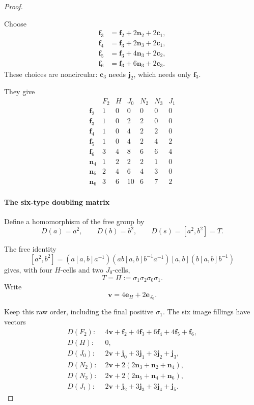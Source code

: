 \begin{proof}
\begin{itemize}[leftmargin=*]
\end{itemize}
Choose
\[
\begin{aligned}
\mathbf f_3&=\mathbf f_2+2\mathbf n_2+2\mathbf c_1,\\
\mathbf f_4&=\mathbf f_3+2\mathbf n_3+2\mathbf c_1,\\
\mathbf f_5&=\mathbf f_3+4\mathbf n_3+2\mathbf c_2,\\
\mathbf f_6&=\mathbf f_3+6\mathbf n_3+2\mathbf c_3.
\end{aligned}
\]
These choices are noncircular: \(\mathbf c_3\) needs \(\mathbf j_2\), which needs only \(\mathbf f_3\).

They give
\[
\begin{array}{c|rrrrrr}
&F_2&H&J_0&N_2&N_3&J_1\\ \hline
\mathbf f_2&1&0&0&0&0&0\\
\mathbf f_3&1&0&2&2&0&0\\
\mathbf f_4&1&0&4&2&2&0\\
\mathbf f_5&1&0&4&2&4&2\\
\mathbf f_6&3&4&8&6&6&4\\
\mathbf n_4&1&2&2&2&1&0\\
\mathbf n_5&2&4&6&4&3&0\\
\mathbf n_6&3&6&10&6&7&2
\end{array}
\]

\paragraph{The six-type doubling matrix}

Define a homomorphism of the free group by
\[
D(a)=a^2,\qquad D(b)=b^2,\qquad
D(s)=[a^2,b^2]=T.
\]

The free identity
\[
[a^2,b^2]
=(a[a,b]a^{-1})(ab[a,b]b^{-1}a^{-1})
[a,b](b[a,b]b^{-1})
\]
gives, with four \(H\)-cells and two \(J_0\)-cells,
\[
T=\Pi:=\sigma_1\sigma_2\sigma_0\sigma_1.
\]
Write
\[
\mathbf v=4\mathbf e_H+2\mathbf e_{J_0}.
\]

Keep this raw order, including the final positive \(\sigma_1\). The six image fillings have vectors
\[
\begin{aligned}
D(F_2):\;&4\mathbf v+\mathbf f_2+4\mathbf f_3
 +6\mathbf f_4+4\mathbf f_5+\mathbf f_6,\\
D(H):\;&0,\\
D(J_0):\;&2\mathbf v+\mathbf j_0+3\mathbf j_1
 +3\mathbf j_2+\mathbf j_3,\\
D(N_2):\;&2\mathbf v+2(2\mathbf n_3+\mathbf n_2+\mathbf n_4),\\
D(N_3):\;&2\mathbf v+2(2\mathbf n_5+\mathbf n_4+\mathbf n_6),\\
D(J_1):\;&2\mathbf v+\mathbf j_2+3\mathbf j_3
 +3\mathbf j_4+\mathbf j_5.
\end{aligned}\tag{G.F5}
\]


\end{proof}
